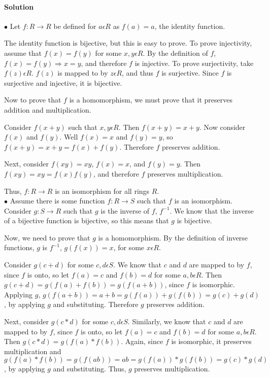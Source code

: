 \documentclass[a4paper,11pt]{article}
\begin{document}
\paragraph{Solution\\}  
$\bullet$ Let $f: R \rightarrow R$ be defined for $a \epsilon R$ as  $f(a) = a$, the identity function. 

The identity function is bijective, but this is easy to prove. To prove injectivity, assume that $f(x) = f(y)$ for some $x,y \epsilon R$. By the definition of $f$, $f(x) = f(y) \Rightarrow x = y$, and therefore $f$ is injective. To prove surjectivity, take $f(z) \epsilon R$. $f(z)$ is mapped to by $z \epsilon R$, and thus $f$ is surjective. Since $f$ is surjective and injective, it is bijective.

Now to prove that $f$ is a homomorphism, we must prove that it preserves addition and multiplication. 

Consider $f(x + y)$ such that $x,y \epsilon R$. Then $f(x+y) = x + y$. Now consider $f(x)$ and $f(y)$. Well $f(x) = x$ and $f(y) = y$, so $f(x+y) = x + y = f(x) + f(y)$. Therefore $f$ preserves addition.

Next, consider $f(xy) = xy$, $f(x) = x$, and $f(y) = y$. Then $f(xy) = xy = f(x)f(y)$, and therefore $f$ preserves multiplication.

Thus, $f: R \rightarrow R$ is an isomorphism for all rings $R$.\\

$\bullet$ Assume there is some function $f: R \rightarrow S$ such that $f$ is an isomorphism. Consider $g: S \rightarrow R$ such that $g$ is the inverse of $f$, $f^{-1}$. We know that the inverse of a bijective function is bijective, so this means that $g$ is bijective. 

Now, we need to prove that $g$ is a homomorphism. By the definition of inverse functions, $g$ is $f^{-1}$, $g(f(x)) = x$, for some $x \epsilon R$.

Consider $g(c + d)$ for some $c,d \epsilon S$. We know that $c$ and $d$ are mapped to by $f$, since $f$ is onto, so let $f(a) = c$ and $f(b) = d$ for some $a,b \epsilon R$. Then $g(c + d) = g(f(a) + f(b)) = g(f(a+b))$, since $f$ is isomorphic. Applying $g$, $g(f(a+b)) = a + b = g(f(a)) + g(f(b)) = g(c) + g(d)$, by applying $g$ and substituting. Therefore $g$ preserves addition.

Next, consider $g(c * d)$ for some $c,d \epsilon S$. Similarly, we know that $c$ and $d$ are mapped to by $f$, since $f$ is onto, so let $f(a) = c$ and $f(b) = d$ for some $a,b \epsilon R$. Then $g(c * d) = g(f(a) * f(b))$. Again, since $f$ is isomorphic, it preserves multiplication and $g(f(a)*f(b)) = g(f(ab)) = ab = g(f(a))*g(f(b)) = g(c) * g(d)$, by applying $g$ and substituting. Thus, $g$ preserves multiplication. 
\end{document}
